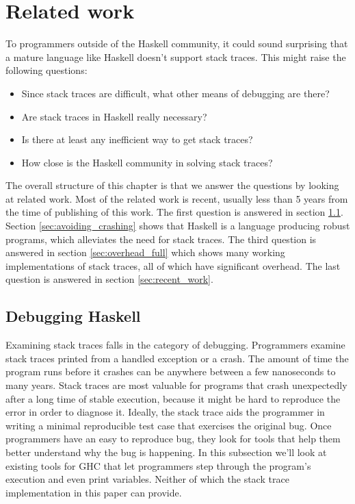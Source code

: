 \chapter{Related work} \label{chp:related_work}

To programmers outside of the Haskell community, it could sound
surprising that a mature language like Haskell doesn't support stack
traces. This might raise the following questions:

\begin{itemize}
  \itemsep1pt\parskip0pt
  \item
    Since stack traces are difficult, what other means of debugging are
    there?
  \item
    Are stack traces in Haskell really necessary?
  \item
    Is there at least any inefficient way to get stack traces?
  \item
    How close is the Haskell community in solving stack traces?
\end{itemize}

The overall structure of this chapter is that we answer the questions
by looking at related work. Most of the
related work is recent, usually less than 5 years from the time of
publishing of this work. The first question is answered in section
\ref{sec:debugging_haskell}. Section \ref{sec:avoiding_crashing}
shows that Haskell is a language producing robust programs, which
alleviates the need for stack traces.
The third question is answered in section
\ref{sec:overhead_full} which shows many working implementations of
stack traces, all of which have significant overhead. The last question
is answered in section \ref{sec:recent_work}.

\section{Debugging Haskell} \label{sec:debugging_haskell}

Examining stack traces falls in the category of debugging. Programmers
examine stack traces printed from a handled exception or a
crash. The amount of time the program runs before it crashes can be
anywhere between a few nanoseconds to many years. Stack traces are most
valuable for programs that crash unexpectedly after a long time of
stable execution, because it might be hard to reproduce the error in
order to diagnose it. Ideally, the stack trace aids the programmer in
writing a minimal reproducible test case that exercises the original
bug. Once programmers have an easy to reproduce bug, they look for
tools that help them better understand why the bug is happening. In this
subsection we'll look at existing tools for GHC that let programmers
step through the program's execution and even print variables. Neither of
which the stack trace implementation in this paper can provide.

